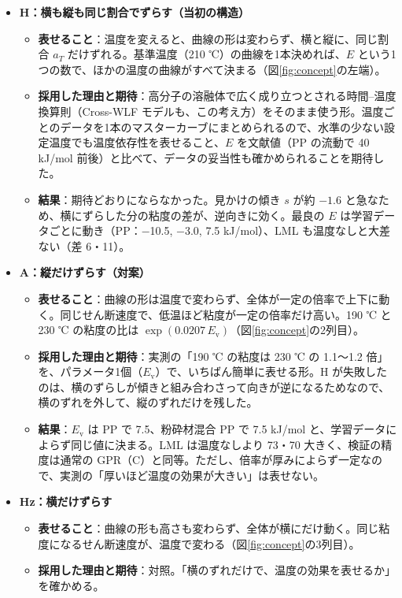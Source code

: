 \documentclass[paper=a4paper,fontsize=10.5pt,line_length=44zw,number_of_lines=38]{jlreq}
\newcommand{\Ev}{E_{\mathrm{v}}}
\newenvironment{points}{\begin{itemize}[label=$\triangleright$,leftmargin=1.5\zw,itemsep=0.3ex,topsep=0.5ex,parsep=0pt]}{\end{itemize}}
\newcommand{\ptn}[1]{\item \textbf{#1}}
\begin{document}
\begin{points}
\ptn{H：横も縦も同じ割合でずらす（当初の構造）}
  \begin{itemize}[leftmargin=1.5\zw,itemsep=0.2ex,topsep=0.2ex,parsep=0pt]
  \item \textbf{表せること}：温度を変えると、曲線の形は変わらず、横と縦に、同じ割合 $a_T$ だけずれる。基準温度（210 ℃）の曲線を1本決めれば、$E$ という1つの数で、ほかの温度の曲線がすべて決まる（図\ref{fig:concept}の左端）。
  \item \textbf{採用した理由と期待}：高分子の溶融体で広く成り立つとされる時間--温度換算則（Cross-WLF モデルも、この考え方）をそのまま使う形。温度ごとのデータを1本のマスターカーブにまとめられるので、水準の少ない設定温度でも温度依存性を表せること、$E$ を文献値（PP の流動で 40 kJ/mol 前後）と比べて、データの妥当性も確かめられることを期待した。
  \item \textbf{結果}：期待どおりにならなかった。見かけの傾き $s$ が約 $-1.6$ と急なため、横にずらした分の粘度の差が、逆向きに効く。最良の $E$ は学習データごとに動き（PP：$-$10.5, $-$3.0, 7.5 kJ/mol）、LML も温度なしと大差ない（差 6・11）。
  \end{itemize}
\ptn{A：縦だけずらす（対案）}
  \begin{itemize}[leftmargin=1.5\zw,itemsep=0.2ex,topsep=0.2ex,parsep=0pt]
  \item \textbf{表せること}：曲線の形は温度で変わらず、全体が一定の倍率で上下に動く。同じせん断速度で、低温ほど粘度が一定の倍率だけ高い。190 ℃ と 230 ℃ の粘度の比は $\exp(0.0207\,\Ev)$（図\ref{fig:concept}の2列目）。
  \item \textbf{採用した理由と期待}：実測の「190 ℃ の粘度は 230 ℃ の 1.1〜1.2 倍」を、パラメータ1個（$\Ev$）で、いちばん簡単に表せる形。H が失敗したのは、横のずらしが傾きと組み合わさって向きが逆になるためなので、横のずれを外して、縦のずれだけを残した。
  \item \textbf{結果}：$\Ev$ は PP で 7.5、粉砕材混合 PP で 7.5 kJ/mol と、学習データによらず同じ値に決まる。LML は温度なしより 73・70 大きく、検証の精度は通常の GPR（C）と同等。ただし、倍率が厚みによらず一定なので、実測の「厚いほど温度の効果が大きい」は表せない。
  \end{itemize}
\ptn{Hz：横だけずらす}
  \begin{itemize}[leftmargin=1.5\zw,itemsep=0.2ex,topsep=0.2ex,parsep=0pt]
  \item \textbf{表せること}：曲線の形も高さも変わらず、全体が横にだけ動く。同じ粘度になるせん断速度が、温度で変わる（図\ref{fig:concept}の3列目）。
  \item \textbf{採用した理由と期待}：対照。「横のずれだけで、温度の効果を表せるか」を確かめる。

\end{itemize}
\end{points}
\end{document}
